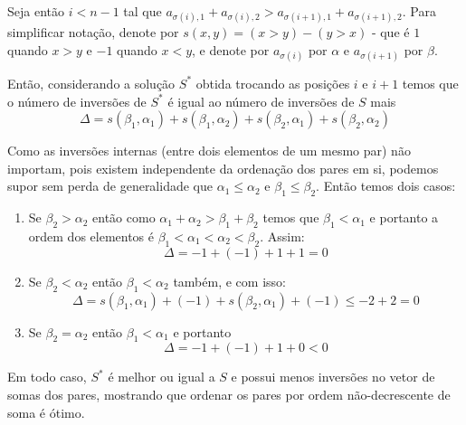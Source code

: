 \documentclass{article}
\begin{document}
Seja então \(i < n - 1\) tal que \(a_{\sigma(i), 1} + a_{\sigma(i), 2} > a_{\sigma(i + 1), 1} + a_{\sigma(i + 1), 2}\).
Para simplificar notação, denote por \(s(x, y) = (x > y) - (y > x)\) - que é \(1\) quando \(x > y\) e \(-1\) quando \(x < y\),
e denote por \(a_{\sigma(i)}\) por \(\alpha\) e \(a_{\sigma(i + 1)}\) por \(\beta\).

Então, considerando a solução \(S^{*}\) obtida trocando as posições \(i\) e \(i + 1\) temos que o número de inversões
de \(S^{*}\) é igual ao número de inversões de \(S\) mais
\[\Delta = s(\beta_1, \alpha_1) + s(\beta_1, \alpha_2) + s(\beta_2, \alpha_1) + s(\beta_2, \alpha_2)\]

Como as inversões internas (entre dois elementos de um mesmo par) não importam, pois existem independente da ordenação
dos pares em si, podemos supor sem perda de generalidade que \(\alpha_1 \leq \alpha_2\) e \(\beta_1 \leq \beta_2\). Então temos dois casos:

\begin{enumerate}
    \item Se \(\beta_2 > \alpha_2\) então como \(\alpha_1 + \alpha_2 > \beta_1 + \beta_2\) temos que \(\beta_1 < \alpha_1\)
    e portanto a ordem dos elementos é \(\beta_1 < \alpha_1 < \alpha_2 < \beta_2\). Assim:
    \[
        \Delta = -1 + (-1) + 1 + 1 = 0
    \]
    \item Se \(\beta_2 < \alpha_2\) então \(\beta_1 < \alpha_2\) também, e com isso:
    \[
        \Delta = s(\beta_1, \alpha_1) + (-1) + s(\beta_2, \alpha_1) + (-1) \leq -2 + 2 = 0
    \]
    \item Se \(\beta_2 = \alpha_2\) então \(\beta_1 < \alpha_1\) e portanto
    \[
        \Delta = -1 + (-1) + 1 + 0 < 0
    \]
\end{enumerate}
Em todo caso, \(S^{*}\) é melhor ou igual a \(S\) e possui menos inversões no vetor de somas dos pares, mostrando
que ordenar os pares por ordem não-decrescente de soma é ótimo.
\end{document}
